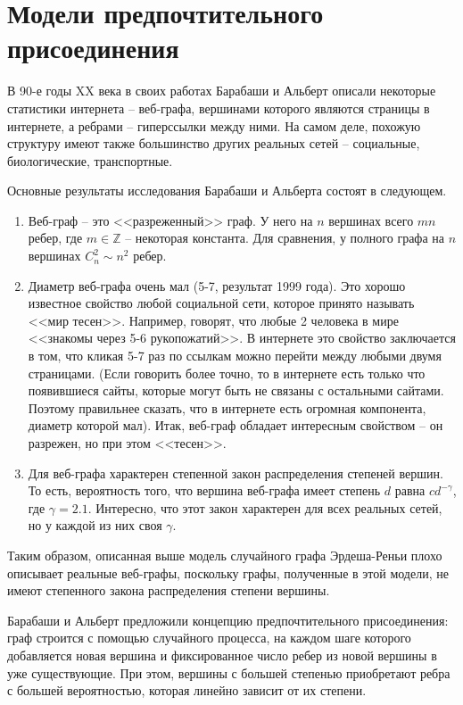 \documentclass[14pt]{extreport}
\begin{document}
\section{Модели предпочтительного присоединения}

В 90-е годы XX века в своих работах Барабаши и Альберт описали некоторые статистики интернета -- веб-графа, вершинами которого являются страницы в интернете, а ребрами -- гиперссылки между ними. На самом деле, похожую структуру имеют также большинство других реальных сетей -- социальные, биологические, транспортные.

Основные результаты исследования Барабаши и Альберта состоят в следующем.
\begin{enumerate}

\item Веб-граф -- это <<разреженный>> граф. У него на $n$ вершинах всего $mn$ ребер, где $m \in \mathbb{Z}$ -- некоторая константа. Для сравнения, у полного графа на $n$ вершинах $C_n^2 \sim n^2$ ребер. 

\item Диаметр веб-графа очень мал (5-7, результат 1999 года). Это хорошо известное свойство любой социальной сети, которое принято называть <<мир тесен>>. Например, говорят, что любые 2 человека в мире <<знакомы через 5-6 рукопожатий>>. В интернете это свойство заключается в том, что кликая 5-7 раз по ссылкам можно перейти между любыми двумя страницами. (Если говорить более точно, то в интернете есть только что появившиеся сайты, которые могут быть не связаны с остальными сайтами. Поэтому правильнее сказать, что в интернете есть огромная компонента, диаметр которой мал). Итак, веб-граф обладает интересным свойством -- он разрежен, но при этом <<тесен>>.

\item Для веб-графа характерен степенной закон распределения степеней вершин. То есть, вероятность того, что вершина веб-графа имеет степень $d$ равна $cd^{-\gamma}$, где $\gamma = 2.1$. Интересно, что этот закон характерен для всех реальных сетей, но у каждой из них своя $\gamma$.
\end{enumerate}

Таким образом, описанная выше модель случайного графа Эрдеша-Реньи плохо описывает реальные веб-графы, поскольку графы, полученные в этой модели, не имеют степенного закона распределения степени вершины. 

Барабаши и Альберт предложили концепцию предпочтительного присоединения: граф строится с помощью случайного процесса, на каждом шаге которого добавляется новая вершина и фиксированное число ребер из новой вершины в уже существующие. При этом, вершины с большей степенью приобретают ребра с большей вероятностью, которая линейно зависит от их степени.
\end{document}
